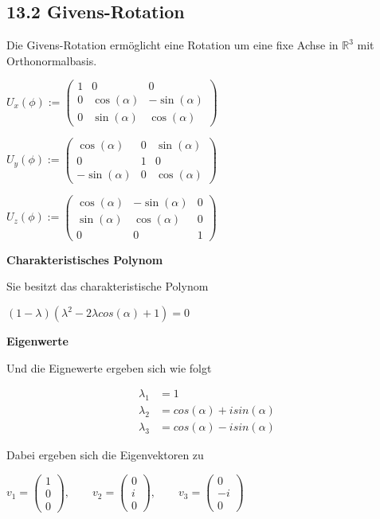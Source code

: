 \subsection{13.2 Givens-Rotation}{
\vskip1pt

Die Givens-Rotation ermöglicht eine Rotation um eine fixe Achse in $\mathbb{R}^3$ mit Orthonormalbasis.\par

\begin{center}
$U_x(\phi) := \begin{pmatrix}
				      1       &       0       &      0       \\
			          0       &  \cos(\alpha) & -\sin(\alpha)\\
				      0       & \sin(\alpha)  &  \cos(\alpha) 
			  \end{pmatrix}$\vskip3pt\par
$U_y(\phi) := \begin{pmatrix}
			     \cos(\alpha) &       0       &  \sin(\alpha) \\
				       0      &       1       &      0        \\
				-\sin(\alpha) &       0       &  \cos(\alpha)
			  \end{pmatrix}$\vskip3pt\par
$U_z(\phi) := \begin{pmatrix}
			     \cos(\alpha) & -\sin(\alpha) &      0       \\
				 \sin(\alpha) &  \cos(\alpha) &      0       \\
				      0       &       0       &      1
			  \end{pmatrix}$\par	  
\end{center}

\textbf{Charakteristisches Polynom}\par\vskip1pt
Sie besitzt das charakteristische Polynom
\begin{center}
$(1 - \lambda)(\lambda^2 -2\lambda cos(\alpha) + 1) = 0$
\end{center}
\vskip3pt

\textbf{Eigenwerte}\par\vskip2pt
Und die Eignewerte ergeben sich wie folgt

\vspace{-7pt}
\begin{align*}
\lambda_1 &= 1 \\
\lambda_2 &= cos(\alpha) + isin(\alpha) \\
\lambda_3 &= cos(\alpha) - isin(\alpha)
\end{align*}
\vspace{-7pt}

Dabei ergeben sich die Eigenvektoren zu
\begin{center}
$v_1 = \begin{pmatrix} 1\\ 0\\ 0\end{pmatrix}, \qquad v_2 = \begin{pmatrix} 0\\ i\\ 0\end{pmatrix}, \qquad v_3 = \begin{pmatrix} 0\\ -i\\ 0\end{pmatrix}$
\end{center}

}
\WhiteSpace
